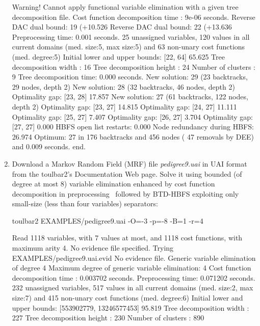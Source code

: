 \begin{enumerate}
{\begin{DoxyCode}
Warning! Cannot apply functional variable elimination with a given tree decomposition file.
Cost function decomposition time : 9e-06 seconds.
Reverse DAC dual bound: 19 (+10.526%
Reverse DAC dual bound: 22 (+13.636%
Preprocessing time: 0.001 seconds.
25 unassigned variables, 120 values in all current domains (med. size:5, max size:5) and 63 non-unary cost functions (med. degree:5)
Initial lower and upper bounds: [22, 64] 65.625%
Tree decomposition width  : 16
Tree decomposition height : 24
Number of clusters         : 9
Tree decomposition time: 0.000 seconds.
New solution: 29 (23 backtracks, 29 nodes, depth 2)
New solution: 28 (32 backtracks, 46 nodes, depth 2)
Optimality gap: [23, 28] 17.857 %
New solution: 27 (61 backtracks, 122 nodes, depth 2)
Optimality gap: [23, 27] 14.815 %
Optimality gap: [24, 27] 11.111 %
Optimality gap: [25, 27] 7.407 %
Optimality gap: [26, 27] 3.704 %
Optimality gap: [27, 27] 0.000 %
HBFS open list restarts: 0.000 %
Node redundancy during HBFS: 26.974 %
Optimum: 27 in 176 backtracks and 456 nodes ( 47 removals by DEE) and 0.009 seconds.
end.
\end{DoxyCode}}
\item Download a Markov Random Field (MRF) file {\em pedigree9.uai} in UAI format from the toulbar2's Documentation Web page. Solve it using bounded (of degree at most 8) variable elimination enhanced by cost function decomposition in preprocessing~\cite{Favier11a} followed by BTD-HBFS exploiting only small-size (less than four variables) separators:
\begin{DoxyCode}
	toulbar2 EXAMPLES/pedigree9.uai -O=-3 -p=-8 -B=1 -r=4
\end{DoxyCode}
{\scriptsize
\begin{DoxyCode}
Read 1118 variables, with 7 values at most, and 1118 cost functions, with maximum arity 4.
No evidence file specified. Trying EXAMPLES/pedigree9.uai.evid
No evidence file. 
Generic variable elimination of degree 4
Maximum degree of generic variable elimination: 4
Cost function decomposition time : 0.003702 seconds.
Preprocessing time: 0.071202 seconds.
232 unassigned variables, 517 values in all current domains (med. size:2, max size:7) and 415 non-unary cost functions (med. degree:6)
Initial lower and upper bounds: [553902779, 13246577453] 95.819%
Tree decomposition width  : 227
Tree decomposition height : 230
Number of clusters        : 890

\end{DoxyCode}}
\end{enumerate}
